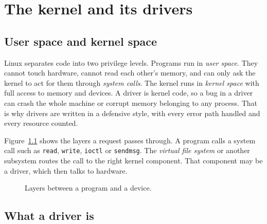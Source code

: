 \documentclass[11pt,a4paper,oneside]{report}
\newcommand{\code}[1]{\texttt{\small #1}}
\begin{document}
\chapter{The kernel and its drivers}\label{ch:kernel}

\section{User space and kernel space}

Linux separates code into two privilege levels. Programs run in \emph{user space}. They cannot touch hardware, cannot read each other's memory, and can only ask the kernel to act for them through \emph{system calls}. The kernel runs in \emph{kernel space} with full access to memory and devices. A driver is kernel code, so a bug in a driver can crash the whole machine or corrupt memory belonging to any process. That is why drivers are written in a defensive style, with every error path handled and every resource counted.

Figure~\ref{fig:layers} shows the layers a request passes through. A program calls a system call such as \code{read}, \code{write}, \code{ioctl} or \code{sendmsg}. The \emph{virtual file system} or another subsystem routes the call to the right kernel component. That component may be a driver, which then talks to hardware.

\begin{figure}[ht]
\centering
{}
\caption{Layers between a program and a device.}\label{fig:layers}
\end{figure}

\section{What a driver is}
\end{document}

